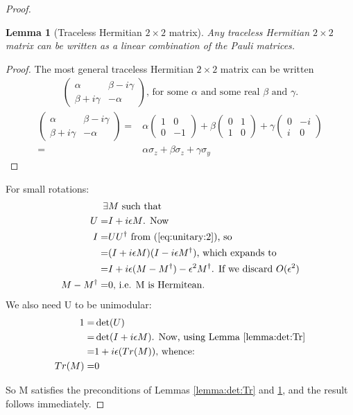 \documentclass[]{article}
\newtheorem{lemma}[thm]{Lemma}
\begin{document}
\begin{proof}
	\begin{lemma}[Traceless Hermitian $2\times2$ matrix]\label{lemma:traceless:22}
		Any traceless Hermitian $2\times2$ matrix can be written as a linear combination of the Pauli  matrices.
	\end{lemma}
	\begin{proof}
		The most general traceless Hermitian  $2\times2$ matrix can be written
		\begin{align*}
			\begin{pmatrix} 
				\alpha&\beta - i\gamma\\
				\beta + i\gamma&-\alpha
			\end{pmatrix} \text{, for some $\alpha$ and some real $\beta$ and $\gamma$.}
		\end{align*}
		\begin{align*}
			\begin{pmatrix} 
				\alpha&\beta - i\gamma\\
				\beta + i\gamma&-\alpha
			\end{pmatrix} =& \alpha  \begin{pmatrix} 
			1&0\\
			0&-1
			\end{pmatrix} +  \beta \begin{pmatrix} 
			0&1\\
			1&0
			\end{pmatrix} +  \gamma \begin{pmatrix} 
			0&-i\\
			i&0
			\end{pmatrix}\\
			=& \alpha \sigma_z + \beta \sigma_z + \gamma \sigma_y
		\end{align*}
		
	\end{proof}

	For small rotations:
	\begin{align*}
	\exists& M \text{ such that}\\
	U =& I + i \epsilon M \text{. Now}\\
	I =&U U^\dagger \text{ from (\ref{eq:unitary:2}), so}\\
	=& (I + i \epsilon M)(I - i\epsilon M^\dagger) \text{, which expands to}\\
	=& I + i \epsilon(M - M^\dagger) - \epsilon^2 M^\dagger \text{. If we discard $O(\epsilon^2)$}\\
	M - M^\dagger =& 0 \text{, i.e. M is Hermitean.}
	\end{align*}
	We also need U to be unimodular:
	\begin{align*}
	1=&\det(U)\\
	=& \det( I + i \epsilon M) \text{. Now, using Lemma \ref{lemma:det:Tr}}\\
	=& 1 + i\epsilon(Tr(M)) \text{, whence:}\\
	Tr(M) =&0
	\end{align*}
	
	So M satisfies the preconditions of Lemmas \ref{lemma:det:Tr} and \ref{lemma:traceless:22}, and the result follows immediately.
	
\end{proof}
\end{document}
